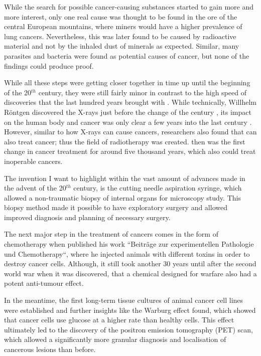 While the search for possible cancer-causing substances started to gain more and more interest, only one real cause was thought to be found in the ore of the central European mountains, where miners would have a higher prevalence of lung cancers. Nevertheless, this was later found to be caused by radioactive material and not by the inhaled dust of minerals as expected. Similar, many parasites and bacteria were found as potential causes of cancer, but none of the findings could produce proof.

While all these steps were getting closer together in time up until the beginning of the 20$^{th}$ century, they were still fairly minor in contrast to the high speed of discoveries that the last hundred years brought with . While technically, Willhelm R\"ontgen discovered the X-rays just before the change of the century \cite{Roentgen1898}, its impact on the human body and cancer was only clear a few years into the last century \cite{Frieben1902,Scholtz1902}. However, similar to how X-rays can cause cancers, researchers also  found that  can also treat cancer; thus the field of radiotherapy was created.  then was the first  change in cancer treatment for around five thousand years, which also could treat inoperable cancers.

The  invention I want to highlight within the vast amount of advances made in the advent of the 20$^{th}$ century, is the cutting needle aspiration syringe, which allowed a non-traumatic biopsy of internal organs for microscopy study. This biopsy method made it possible  to have exploratory surgery and allowed improved diagnosis and planning of necessary surgery.

The next major step in the treatment of cancers comes in the form of chemotherapy when \textcite{Ehrlich1909} published his work ``Beitr\"age zur experimentellen Pathologie und Chemotherapy``, where he injected animals with different toxins in order to destroy cancer cells. Although, it still took another 30 years until after the second world war when it was discovered, that a chemical designed for warfare also had a potent anti-tumour effect.

In the meantime, the first long-term tissue cultures of animal cancer cell lines were established and further insights like the Warburg effect \cite{Warburg1928}  found, which showed that cancer cells use glucose at a higher rate than healthy cells. This effect ultimately led to the discovery of the positron emission tomography (PET) scan, which allowed a significantly more granular diagnosis and localisation of cancerous lesions than before.

